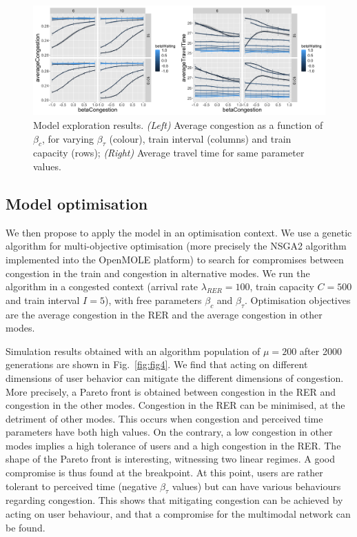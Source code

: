 \documentclass[3p,times,procedia]{elsarticle}
\begin{document}
\begin{figure}%
\centerline{\includegraphics[width=\linewidth]{figures/Fig3.png}}
\caption{Model exploration results. \textit{(Left)} Average congestion as a function of $\beta_c$, for varying $\beta_{\tau}$ (colour), train interval (columns) and train capacity (rows); \textit{(Right)} Average travel time for same parameter values.\label{fig:fig3}}
\end{figure}

\subsection{Model optimisation}


We then propose to apply the model in an optimisation context. We use a genetic algorithm for multi-objective optimisation (more precisely the NSGA2 algorithm implemented into the OpenMOLE platform) to search for compromises between congestion in the train and congestion in alternative modes. We run the algorithm in a congested context (arrival rate $\lambda_{RER} = 100$, train capacity $C=500$ and train interval $I=5$), with free parameters $\beta_c$ and $\beta_{\tau}$. Optimisation objectives are the average congestion in the RER and the average congestion in other modes.

Simulation results obtained with an algorithm population of $\mu = 200$ after 2000 generations are shown in Fig.~\ref{fig:fig4}. We find that acting on different dimensions of user behavior can mitigate the different dimensions of congestion. More precisely, a Pareto front is obtained between congestion in the RER and congestion in the other modes. Congestion in the RER can be minimised, at the detriment of other modes. This occurs when congestion and perceived time parameters have both high values. On the contrary, a low congestion in other modes implies a high tolerance of users and a high congestion in the RER. The shape of the Pareto front is interesting, witnessing two linear regimes. A good compromise is thus found at the breakpoint. At this point, users are rather tolerant to perceived time (negative $\beta_{\tau}$ values) but can have various behaviours regarding congestion. This shows that mitigating congestion can be achieved by acting on user behaviour, and that a compromise for the multimodal network can be found.
\end{document}
